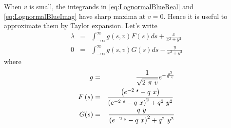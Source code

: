\documentclass{article}
\begin{document}
When $v$ is small, the integrands in \eqref{eq:LognormalBlueReal} and
\eqref{eq:LognormalBlueImag} have sharp maxima at $v = 0$. Hence it is
useful to approximate them by Taylor expansion. Let's write
\begin{eqnarray*}
  \lambda &=& \int _{-\infty }^{\infty }\!g \left( s,v \right) F \left( s
  \right) {ds}+{\frac {x}{{x}^{2}+{y}^{2}}} \\
  0 &=& \int _{-\infty }^{\infty }\!g \left( s,v \right) G \left( s
  \right) {ds}-{\frac {y}{{x}^{2}+{y}^{2}}}
\end{eqnarray*}
where
\begin{eqnarray*}
g &=& \frac{1}{\sqrt{2\mathop{\rm  }\pi \mathop{\rm  }v }}e^{-\frac{s
    ^{2}}{2\mathop{\rm  }v }}\\
F \left(s \right) &=& \frac{\left(e^{-2\mathop{\rm  }s }-q \mathop{\rm
    }x \right)}{\left(e^{-2\mathop{\rm  }s }-q \mathop{\rm  }x
  \right)^{2}+q ^{2}\mathop{\rm  }y ^{2}}\mathop{\rm  } \\
G(s) &=& \frac{q \mathop{\rm  }y }{\left(e^{-2\mathop{\rm  }s }-q
    \mathop{\rm  }x \right)^{2}+q ^{2}\mathop{\rm  }y ^{2}}\\
\end{eqnarray*}
\end{document}
